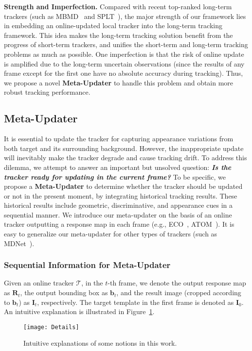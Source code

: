 \documentclass[10pt,twocolumn,letterpaper]{article}
\begin{document}
\noindent \textbf{Strength and Imperfection.} Compared with recent top-ranked
long-term trackers (such as MBMD~\cite{Zhang-VOT18-MBMD} and
SPLT~\cite{Yan-ICCV19-SPLT}), the major strength of our framework lies in embedding
an online-updated local tracker into the long-term tracking framework. This idea makes
the long-term tracking solution benefit from the progress of short-term trackers,
and unifies the short-term and long-term tracking problems as much as possible.
One imperfection is that the risk of online update is amplified due to the long-term
uncertain observations (since the results of any frame except for the first one have no
absolute accuracy during tracking).
Thus, we propose a novel \textbf{Meta-Updater} to handle this problem and
obtain more robust tracking performance.
\vspace{-2mm}
\subsection{Meta-Updater}
\vspace{-2mm}
It is essential to update the tracker for capturing appearance variations from both
target and its surrounding background.
However, the inappropriate update will inevitably make the tracker degrade and
cause tracking drift.
To address this dilemma, we attempt to answer an important but unsolved question:
\textbf{\emph{Is the tracker ready for updating in the current frame?}}
To be specific, we propose a \textbf{Meta-Updater} to determine whether the tracker
should be updated or not in the present moment, by integrating historical tracking results.
These historical results include geometric, discriminative, and appearance cues in a
sequential manner.
We introduce our meta-updater on the basis of an online tracker outputting a
response map in each frame (e.g., ECO~\cite{Danelljan-CVPR17-ECO},
ATOM~\cite{Danelljan-CVPR19-ATOM}).
It is easy to generalize our meta-updater for other types of trackers
(such as MDNet~\cite{Nam-CVPR16-MDNet}).

\vspace{-5mm}
\subsubsection{Sequential Information for Meta-Updater}
\label{sec-3-2-1}
\vspace{-2mm}
Given an online tracker $\mathcal{T}$, in the $t$-th frame, we denote the output
response map as $\mathbf{R}_t$, the output bounding box as $\mathbf{b}_t$, and
the result image (cropped according to $\mathbf{b}_t$) as $\mathbf{I}_t$, respectively.
The target template in the first frame is denoted as $\mathbf{I}_0$.
An intuitive explanation is illustrated in Figure~\ref{fig-intuitive}.
\vspace{-2mm}
\begin{figure}[htbp]
	\begin{center}
		\texttt{[image: Details]}
	\end{center}
	\vspace{-3mm}
	\caption{Intuitive explanations of some notions in this work.}
	\label{fig-intuitive}
	\vspace{-3mm}
\end{figure}
\end{document}
